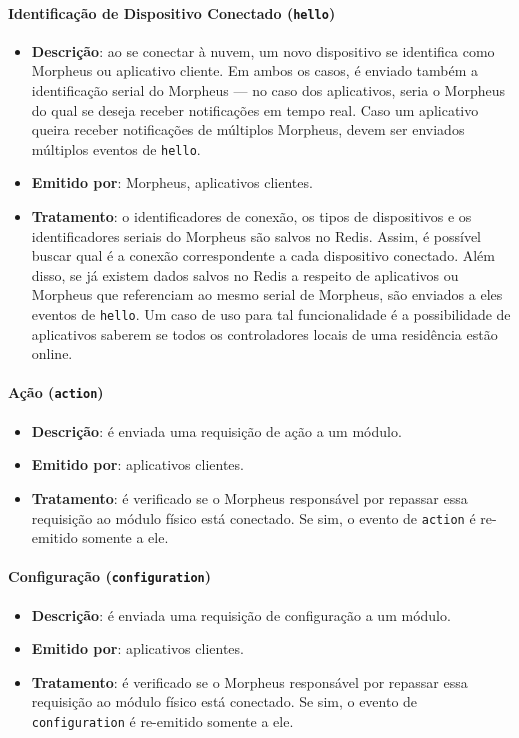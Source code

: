 \paragraph{Identificação de Dispositivo Conectado (\texttt{hello})}
\begin{itemize}
\item \textbf{Descrição}: ao se conectar à nuvem, um novo dispositivo se identifica como Morpheus ou aplicativo cliente. Em ambos os casos, é enviado também a identificação serial do Morpheus --- no caso dos aplicativos, seria o Morpheus do qual se deseja receber notificações em tempo real. Caso um aplicativo queira receber notificações de múltiplos Morpheus, devem ser enviados múltiplos eventos de \texttt{hello}.
\item \textbf{Emitido por}: Morpheus, aplicativos clientes.
\item \textbf{Tratamento}: o identificadores de conexão, os tipos de dispositivos e os identificadores seriais do Morpheus são salvos no Redis. Assim, é possível buscar qual é a conexão correspondente a cada dispositivo conectado.
Além disso, se já existem dados salvos no Redis a respeito de aplicativos ou Morpheus que referenciam ao mesmo serial de Morpheus, são enviados a eles eventos de \texttt{hello}. Um caso de uso para tal funcionalidade é a possibilidade de aplicativos saberem se todos os controladores locais de uma residência estão online.
\end{itemize}

\paragraph{Ação (\texttt{action})}
\begin{itemize}
\item \textbf{Descrição}: é enviada uma requisição de ação a um módulo.
\item \textbf{Emitido por}: aplicativos clientes.
\item \textbf{Tratamento}: é verificado se o Morpheus responsável por repassar essa requisição ao módulo físico está conectado. Se sim, o evento de \texttt{action} é re-emitido somente a ele.
\end{itemize}

\paragraph{Configuração (\texttt{configuration})}
\begin{itemize}
\item \textbf{Descrição}: é enviada uma requisição de configuração a um módulo.
\item \textbf{Emitido por}: aplicativos clientes.
\item \textbf{Tratamento}: é verificado se o Morpheus responsável por repassar essa requisição ao módulo físico está conectado. Se sim, o evento de \texttt{configuration} é re-emitido somente a ele.
\end{itemize}

